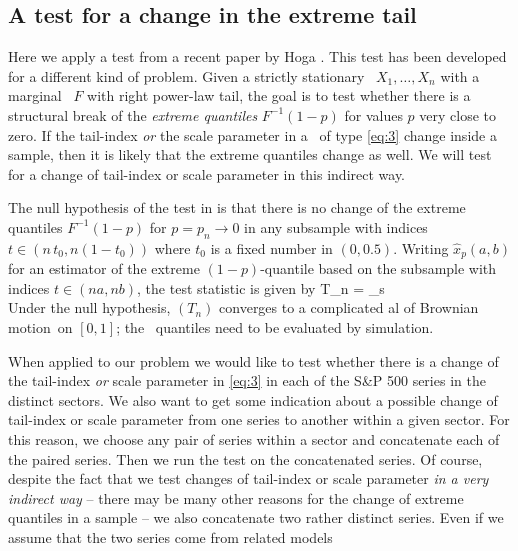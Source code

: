 \subsection{A test for a change in the extreme tail}\label{sec:Hoga}
Here we apply a test from
a recent paper by Hoga \cite{hoga:2016}. This test has been developed
for a different kind of problem. Given a strictly stationary
\ts\ $X_1,\ldots,X_n$ with a marginal \ds\ $F$ with right power-law
tail, the goal is to test whether there is a structural break of the
{\em extreme quantiles} $F^{-1}(1-p)$ for values $p$ very close to
zero. If the tail-index {\em or} the scale parameter in a \ds\ of type
\eqref{eq:3} change inside a sample, then it is likely that the
extreme quantiles change as well. We will test for a change of tail-index or scale parameter in this indirect way.
\par
The null hypothesis of the test in \cite{hoga:2016} is that there is no change of the extreme quantiles $F^{-1}(1-p)$ 
for $p=p_n\to 0$ in any subsample with indices
$t\in (n\,t_0,n(1-t_0))$ where $t_0$ is a fixed number in $(0,0.5)$. Writing $\hat x_p(a,b)$ for an estimator of the extreme $(1-p)$-quantile 
based on the subsample with indices $t\in (na,nb)$, the test statistic is given by
\beam\label{eq:4}
T_n = \sup_{s \in [t_0, 1 - t_0]}
  \nonumber\\
\eeam
Under the null hypothesis, $(T_n)$ converges to a complicated \fct al
of Brownian motion\ on $[0,1]$; the \asy\ quantiles need to be
evaluated by simulation.
\par
When applied to our problem we would like to test 
whether there is a change of the tail-index {\em or} scale parameter in \eqref{eq:3} in each of the S\&P 500 
series in the distinct sectors. We also  want to get some indication about a possible change of tail-index or
scale parameter from one series to another within a given sector. For this reason, we choose any pair of series
within a sector and concatenate each of the paired series. Then we run the test on the concatenated series.
Of course, despite the fact that we test changes of tail-index or scale parameter 
{\em in a very indirect way} -- there may be many other reasons for the change of extreme quantiles in a sample -- 
we also concatenate two rather distinct series. Even if we assume that the two series come from related models
